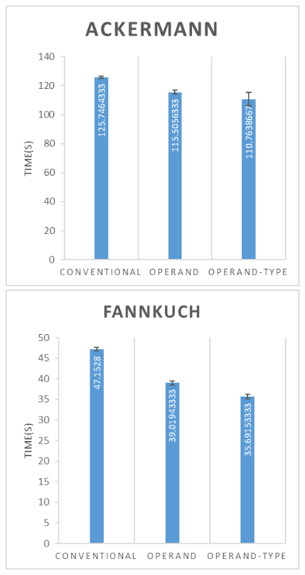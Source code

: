 \documentclass[english,a4paper,12pt]{report}
\begin{document}
\begin{figure}[!htb]
  \includegraphics{ackermann.png}
  \includegraphics{fannkuch.png} 

\end{figure}
\end{document}

